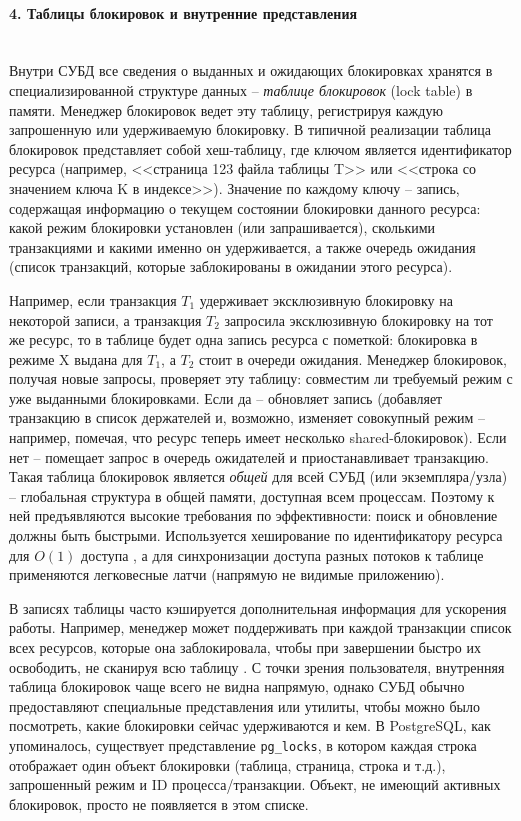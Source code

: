 \paragraph{4. Таблицы блокировок и внутренние представления} ~\\

 Внутри СУБД все сведения о выданных и ожидающих блокировках хранятся в специализированной структуре данных – \textit{таблице блокировок} (lock table) в памяти. Менеджер блокировок ведет эту таблицу, регистрируя каждую запрошенную или удерживаемую блокировку. В типичной реализации таблица блокировок представляет собой хеш-таблицу, где ключом является идентификатор ресурса (например, <<страница 123 файла таблицы T>> или <<строка со значением ключа K в индексе>>). Значение по каждому ключу – запись, содержащая информацию о текущем состоянии блокировки данного ресурса: какой режим блокировки установлен (или запрашивается), сколькими транзакциями и какими именно он удерживается, а также очередь ожидания (список транзакций, которые заблокированы в ожидании этого ресурса). 
 
Например, если транзакция $T_1$ удерживает эксклюзивную блокировку на некоторой записи, а транзакция $T_2$ запросила эксклюзивную блокировку на тот же ресурс, то в таблице будет одна запись ресурса с пометкой: блокировка в режиме X выдана для $T_1$, а $T_2$ стоит в очереди ожидания. Менеджер блокировок, получая новые запросы, проверяет эту таблицу: совместим ли требуемый режим с уже выданными блокировками. Если да – обновляет запись (добавляет транзакцию в список держателей и, возможно, изменяет совокупный режим – например, помечая, что ресурс теперь имеет несколько shared-блокировок). Если нет – помещает запрос в очередь ожидателей и приостанавливает транзакцию. Такая таблица блокировок является \textit{общей} для всей СУБД (или экземпляра/узла) – глобальная структура в общей памяти, доступная всем процессам. Поэтому к ней предъявляются высокие требования по эффективности: поиск и обновление должны быть быстрыми. Используется хеширование по идентификатору ресурса для $O(1)$ доступа \autocite{DMSSMthed}, а для синхронизации доступа разных потоков к таблице применяются легковесные латчи (напрямую не видимые приложению). 
 
 В записях таблицы часто кэшируется дополнительная информация для ускорения работы. Например, менеджер может поддерживать при каждой транзакции список всех ресурсов, которые она заблокировала, чтобы при завершении быстро их освободить, не сканируя всю таблицу \autocite{Silberschatz}. С точки зрения пользователя, внутренняя таблица блокировок чаще всего не видна напрямую, однако СУБД обычно предоставляют специальные представления или утилиты, чтобы можно было посмотреть, какие блокировки сейчас удерживаются и кем. В PostgreSQL, как упоминалось, существует представление \texttt{pg\_locks}, в котором каждая строка отображает один объект блокировки (таблица, страница, строка и т.д.), запрошенный режим и ID процесса/транзакции. Объект, не имеющий активных блокировок, просто не появляется в этом списке.
 

